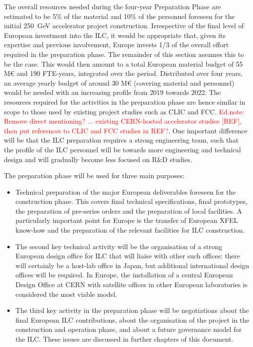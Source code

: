 \documentclass[%
 reprint,
 floatfix,
 amsmath,amssymb,
 aps,
]{revtex4-1}
\newcommand{\todo}[1]{\textcolor{red}{{#1}}}
\begin{document}
The overall resources needed during the four-year Preparation Phase are estimated to be 5\% of the material and 10\% of the personnel 
foreseen for the initial 250~GeV accelerator project construction. Irrespective of the final level of European investment into the ILC,
it would be appropriate that, given its expertise and previous involvement, Europe invests 1/3 of the overall effort required in the 
preparation phase. The remainder of this section assumes this to be the case. This would then amount to a total European material 
budget of 55 M\euro{} and 190 FTE-years, integrated over the period.
Distributed over four years, an average yearly budget of around 30 M\euro{} (covering material and personnel) would be needed with an 
increasing profile from 2019 towards 2022. The resources required for the activities in the preparation phase are hence similar in 
scope to those used by existing project studies such as CLIC and FCC. 
\todo{Ed.note: Remove direct mentioning? ... existing CERN-hosted accelerator studies [REF], then put references to CLIC and FCC studies in REF?}. 
One important difference will be that the ILC preparation 
requires a strong engineering team, such that the profile of the ILC personnel will be towards more engineering and technical 
design and will gradually become less focused on R\&D studies.

The preparation phase will be used for three main purposes:

\begin{itemize}
\item 
Technical preparation of the major European deliverables foreseen for the construction phase. 
This covers final technical specifications, final prototypes, the preparation of pre-series orders and the preparation of local 
facilities. A particularly important point for Europe is the transfer of European XFEL know-how and the preparation of the 
relevant facilities for ILC construction.
\item
The second key technical activity will be the organisation of a strong European design office for ILC that will liaise with 
other such offices: there will certainly be a host-lab office in Japan, but additional international design offices will be 
required. In Europe, the installation of a central European Design Office at CERN with satellite offices in other European laboratories is considered the most viable model.
\item 
The third key activity in the preparation phase will be negotiations about the final European ILC contributions, about the 
organisation of the project in the construction and operation phase, and about a future governance model for the ILC. These issues are discussed in further chapters of this document.
\end{itemize}
\end{document}

